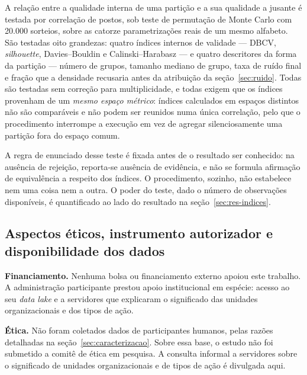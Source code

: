 A relação entre a qualidade interna de uma partição e a sua qualidade a jusante é testada por
correlação de postos, sob teste de permutação de Monte Carlo com 20.000 sorteios, sobre as catorze
parametrizações reais de um mesmo alfabeto. São testadas oito grandezas: quatro índices internos
de validade --- DBCV, \emph{silhouette}, Davies--Bouldin e Calinski--Harabasz --- e quatro
descritores da forma da partição --- número de grupos, tamanho mediano de grupo, taxa de ruído
final e fração que a densidade recusaria antes da atribuição da seção~\ref{sec:ruido}. Todas são
testadas sem correção para multiplicidade, e todas exigem que os índices provenham de um \emph{mesmo
espaço métrico}: índices calculados em espaços distintos não são comparáveis e não podem ser
reunidos numa única correlação, pelo que o procedimento interrompe a execução em vez de agregar
silenciosamente uma partição fora do espaço comum.

A regra de enunciado desse teste é fixada antes de o resultado ser conhecido: na ausência de
rejeição, reporta-se ausência de evidência, e não se formula afirmação de equivalência a respeito
dos índices. O procedimento, sozinho, não estabelece nem uma coisa nem a outra. O poder do teste,
dado o número de observações disponíveis, é quantificado ao lado do resultado na
seção~\ref{sec:res-indices}.

\subsection{Aspectos éticos, instrumento autorizador e disponibilidade dos
dados}\label{sec:etica}

\textbf{Financiamento.} Nenhuma bolsa ou financiamento externo apoiou este trabalho. A
administração participante prestou apoio institucional em espécie: acesso ao seu \emph{data lake} e
a servidores que explicaram o significado das unidades organizacionais e dos tipos de ação.

\textbf{Ética.} Não foram coletados dados de participantes humanos, pelas razões detalhadas na
seção~\ref{sec:caracterizacao}. Sobre essa base, o estudo não foi submetido a comitê de ética em
pesquisa. A consulta informal a servidores sobre o significado de unidades organizacionais e de
tipos de ação é divulgada aqui.

